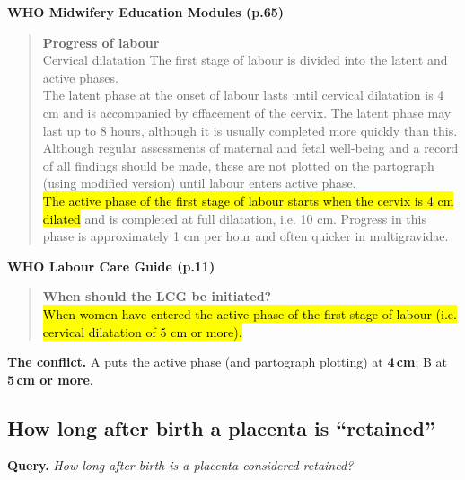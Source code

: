 \smallskip
\noindent\textbf{WHO Midwifery Education Modules (p.65)}
\begin{quote}\footnotesize
\textbf{Progress of labour}\\
Cervical dilatation The first stage of labour is divided into the latent and active phases.\\
The latent phase at the onset of labour lasts until cervical dilatation is 4 cm and is accompanied by effacement of the cervix. The latent phase may last up to 8 hours, although it is usually completed more quickly than this. Although regular assessments of maternal and fetal well-being and a record of all findings should be made, these are not plotted on the partograph (using modified version) until labour enters active phase.\\
\hl{The active phase of the first stage of labour starts when the cervix is 4 cm dilated} and is completed at full dilatation, i.e. 10 cm. Progress in this phase is approximately 1 cm per hour and often quicker in multigravidae.
\end{quote}
\noindent\textbf{WHO Labour Care Guide (p.11)}
\begin{quote}\footnotesize
\textbf{When should the LCG be initiated?}\\
\hl{When women have entered the active phase of the first stage of labour (i.e. cervical dilatation of 5 cm or more).}
\end{quote}
\noindent\textbf{The conflict.} A puts the active phase (and partograph plotting) at \textbf{4\,cm}; B at \textbf{5\,cm or more}.

\subsection*{How long after birth a placenta is ``retained''}
\noindent\textbf{Query.} \emph{How long after birth is a placenta considered retained?}


